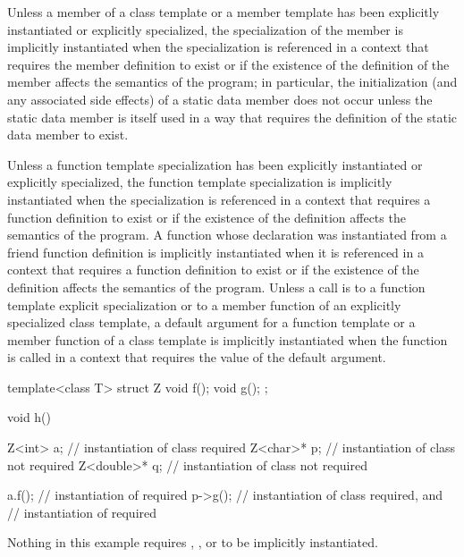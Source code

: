 \pnum
Unless a member of a class template or a member template has been explicitly
instantiated or explicitly specialized,
the specialization of the member is implicitly instantiated when the
specialization is referenced in a context that requires the member definition
to exist or
if the existence of the definition of the member
affects the semantics of the program;
in particular, the initialization (and any associated side effects) of a
static data member does not occur unless the static data member is itself used
in a way that requires the definition of the static data member to exist.

\pnum
Unless a function template specialization has been explicitly instantiated or
explicitly specialized,
the function template specialization is implicitly instantiated when the
specialization is referenced in a context that requires a function definition
to exist or
if the existence of the definition affects the semantics of the program.
A function whose declaration was instantiated from a friend function definition is
implicitly instantiated when it is referenced in a context that
requires a function definition to exist or
if the existence of the definition affects the semantics of the program.
Unless a call is to a function template explicit specialization or
to a member function of an explicitly specialized class template,
a default argument for a function template or a member function of a
class template is implicitly instantiated when the function is
called in a context that requires the value of the default argument.

\pnum
\begin{example}
\begin{codeblock}
template<class T> struct Z {
  void f();
  void g();
};

void h() {
  Z<int> a;         // instantiation of class  required
  Z<char>* p;       // instantiation of class  not required
  Z<double>* q;     // instantiation of class  not required

  a.f();            // instantiation of  required
  p->g();           // instantiation of class  required, and
                    // instantiation of  required
}
\end{codeblock}

Nothing in this example requires
,
,
or
to be implicitly instantiated.
\end{example}

